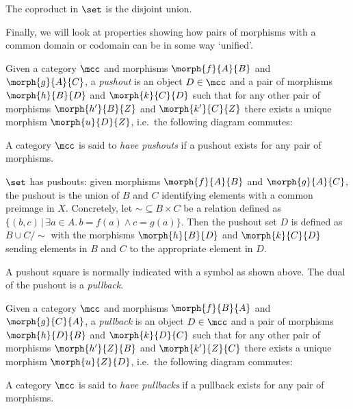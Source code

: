 \begin{example}
    The coproduct in \(\set\) is the disjoint union.
\end{example}

Finally, we will look at properties showing how pairs of morphisms with a
common domain or codomain can be in some way `unified'.

\begin{definition}[Pushout]
    Given a category \(\mcc\) and morphisms
    \(\morph{f}{A}{B}\) and \(\morph{g}{A}{C}\), a
    \emph{pushout} is an object \(D \in \mcc\) and a pair of morphisms
    \(\morph{h}{B}{D}\) and \(\morph{k}{C}{D}\) such that for any other pair of
    morphisms \(\morph{h^\prime}{B}{Z}\) and \(\morph{k^\prime}{C}{Z}\) there
    exists a unique morphism \(\morph{u}{D}{Z}\), i.e.\ the following diagram
    commutes:
    \begin{center}
        
    \end{center}
    A category \(\mcc\) is said to \emph{have pushouts} if a pushout exists for
    any pair of morphisms.
\end{definition}

\begin{example}
    \(\set\) has pushouts: given morphisms \(\morph{f}{A}{B}\) and
    \(\morph{g}{A}{C}\), the pushout is the union of \(B\) and \(C\) identifying
    elements with a common preimage in \(X\).
    Concretely, let \({\sim} \subseteq B \times C\) be a relation defined as
    \(\{(b, c) \,|\, \exists a \in A.\, b = f(a) \wedge c = g(a)\}\).
    Then the pushout set \(D\) is defined as \(B \cup C / \sim\) with the
    morphisms \(\morph{h}{B}{D}\) and \(\morph{k}{C}{D}\) sending elements in
    \(B\) and \(C\) to the appropriate element in \(D\).
\end{example}

A pushout square is normally indicated with a \raisebox{-0.25em}{\(\ulcorner\)}
symbol as shown above.
The dual of the pushout is a \emph{pullback}.

\begin{definition}[Pullback]
    Given a category \(\mcc\) and morphisms \(\morph{f}{B}{A}\) and
    \(\morph{g}{C}{A}\), a \emph{pullback} is an object \(D \in \mcc\) and a
    pair of morphisms \(\morph{h}{D}{B}\) and \(\morph{k}{D}{C}\) such that for
    any other pair of morphisms \(\morph{h^\prime}{Z}{B}\) and
    \(\morph{k^\prime}{Z}{C}\) there exists a unique morphism
    \(\morph{u}{Z}{D}\), i.e.\ the following diagram commutes:
    \begin{center}
        
    \end{center}
    A category \(\mcc\) is said to \emph{have pullbacks} if a pullback exists
    for any pair of morphisms.
\end{definition}

